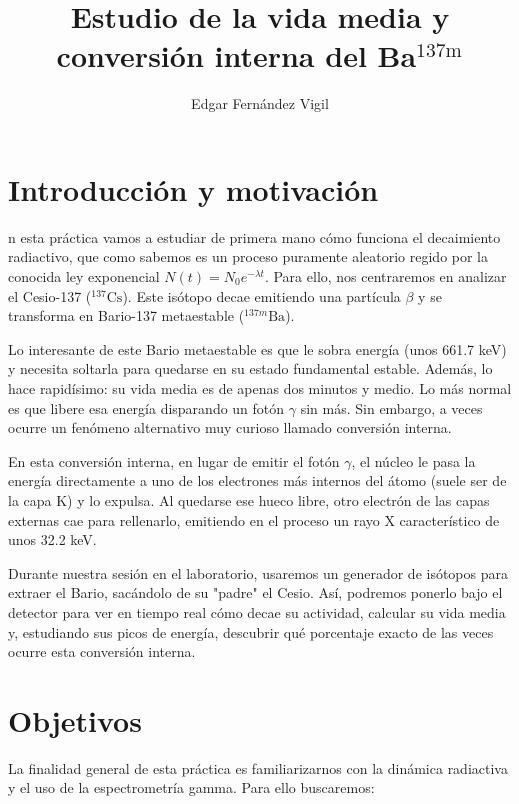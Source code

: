 \documentclass[9pt,a4paper,twocolumn,twoside]{rho-class/rho}
\title{Estudio de la vida media y conversión interna del Ba$^{137\text{m}}$}
\author{Edgar Fernández Vigil}
\affil{Física - Facultad de Ciencias - Universidad de Oviedo}
\begin{document}
    \maketitle
    \thispagestyle{firststyle}

\section{Introducción y motivación}

n esta práctica vamos a estudiar de primera mano cómo funciona el decaimiento radiactivo, que como sabemos es un proceso puramente aleatorio regido por la conocida ley exponencial $N(t)=N_{0}e^{-\lambda t}$. Para ello, nos centraremos en analizar el Cesio-137 ($^{137}\text{Cs}$). Este isótopo decae emitiendo una partícula $\beta$ y se transforma en Bario-137 metaestable ($^{137m}\text{Ba}$).

Lo interesante de este Bario metaestable es que le sobra energía (unos 661.7 keV) y necesita soltarla para quedarse en su estado fundamental estable. Además, lo hace rapidísimo: su vida media es de apenas dos minutos y medio. Lo más normal es que libere esa energía disparando un fotón $\gamma$ sin más. Sin embargo, a veces ocurre un fenómeno alternativo muy curioso llamado conversión interna.

En esta conversión interna, en lugar de emitir el fotón $\gamma$, el núcleo le pasa la energía directamente a uno de los electrones más internos del átomo (suele ser de la capa K) y lo expulsa. Al quedarse ese hueco libre, otro electrón de las capas externas cae para rellenarlo, emitiendo en el proceso un rayo X característico de unos 32.2 keV. 

Durante nuestra sesión en el laboratorio, usaremos un generador de isótopos para extraer el Bario, sacándolo de su "padre" el Cesio. Así, podremos ponerlo bajo el detector para ver en tiempo real cómo decae su actividad, calcular su vida media y, estudiando sus picos de energía, descubrir qué porcentaje exacto de las veces ocurre esta conversión interna.

\section{Objetivos}

La finalidad general de esta práctica es familiarizarnos con la dinámica radiactiva y el uso de la espectrometría gamma. Para ello buscaremos:
\end{document}
